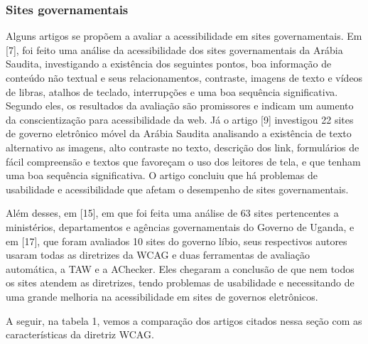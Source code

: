 \documentclass[a4paper]{article}
\begin{document}
\begin{titlepage}
\subsubsection{Sites governamentais}

Alguns artigos se propõem a avaliar a acessibilidade em sites governamentais. Em [7], foi feito uma análise da acessibilidade dos sites governamentais da Arábia Saudita, investigando a existência dos seguintes pontos, boa informação de conteúdo não textual e seus relacionamentos, contraste, imagens de texto e vídeos de libras, atalhos de teclado, interrupções e uma boa sequência significativa. Segundo eles, os resultados da avaliação são promissores e indicam um aumento da conscientização para acessibilidade da web. Já o artigo [9] investigou 22 sites de governo eletrônico móvel da Arábia Saudita analisando a existência de texto alternativo as imagens, alto contraste no texto, descrição dos link, formulários de fácil compreensão e textos que favoreçam o uso dos leitores de tela, e que tenham uma boa sequência significativa. O artigo concluiu que há problemas de usabilidade e acessibilidade que afetam o desempenho de sites governamentais.

Além desses, em [15], em que foi feita uma análise de 63 sites pertencentes a ministérios, departamentos e agências governamentais do Governo de Uganda, e em [17], que foram avaliados 10 sites do governo líbio, seus respectivos autores usaram todas as diretrizes da WCAG e duas ferramentas de avaliação automática, a TAW e a AChecker. Eles chegaram a conclusão de que nem todos os sites atendem as diretrizes, tendo problemas de usabilidade e necessitando de uma grande melhoria na acessibilidade em sites de governos eletrônicos.

A seguir, na tabela 1, vemos a comparação dos artigos citados nessa seção com as características da diretriz WCAG.\\


\end{titlepage}
\end{document}
